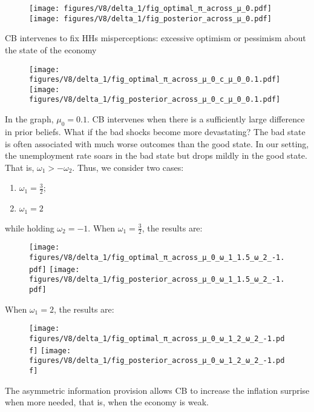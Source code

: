 \documentclass{beamer}
\begin{document}
\begin{frame}[allowframebreaks]
\begin{table}[htp!]
    \end{table}
    \framebreak
    \begin{figure}[htp!]
    \centering
    \texttt{[image: figures/V8/delta\_1/fig\_optimal\_π\_across\_μ\_0.pdf]}
    \texttt{[image: figures/V8/delta\_1/fig\_posterior\_across\_μ\_0.pdf]}
    \end{figure}
    CB intervenes to fix HHs misperceptions: excessive optimism or pessimism about the state of the economy
    \framebreak
    \begin{figure}[htp!]
    \centering
    \texttt{[image: figures/V8/delta\_1/fig\_optimal\_π\_across\_μ\_0\_c\_μ\_0\_0.1.pdf]}
    \texttt{[image: figures/V8/delta\_1/fig\_posterior\_across\_μ\_0\_c\_μ\_0\_0.1.pdf]}
    \end{figure}
    In the graph, $\mu_0 = 0.1$. CB intervenes when there is a sufficiently large difference in prior beliefs.
    \vskip10pt
    \framebreak
    What if the bad shocks become more devastating? 
    \vskip10pt
    The bad state is often associated with much worse outcomes than the good state. 
    \vskip10pt
    In our setting, the unemployment rate soars in the bad state but drops mildly in the good state. That is, $\omega_1 > -\omega_2$.
    \vskip10pt Thus, we consider two cases:
    \begin{enumerate}
        \item $\omega_1 = \frac{3}{2}$;
        \item $\omega_1 = 2$
    \end{enumerate}
    while holding $\omega_2 = -1$. 
\vskip10pt
\framebreak
When $\omega_1 = \frac{3}{2}$, the results are:
\begin{figure}[htp!]
\centering
\texttt{[image: figures/V8/delta\_1/fig\_optimal\_π\_across\_μ\_0\_ω\_1\_1.5\_ω\_2\_-1.pdf]}
\texttt{[image: figures/V8/delta\_1/fig\_posterior\_across\_μ\_0\_ω\_1\_1.5\_ω\_2\_-1.pdf]}
\end{figure}
\vskip10pt
\framebreak
When $\omega_1 = 2$, the results are:
\begin{figure}[htp!]
\centering
\texttt{[image: figures/V8/delta\_1/fig\_optimal\_π\_across\_μ\_0\_ω\_1\_2\_ω\_2\_-1.pdf]}
\texttt{[image: figures/V8/delta\_1/fig\_posterior\_across\_μ\_0\_ω\_1\_2\_ω\_2\_-1.pdf]}
\end{figure}
The asymmetric information provision allows CB to increase the inflation surprise when more needed, that is, when the economy is weak.
\end{frame}
\end{document}
